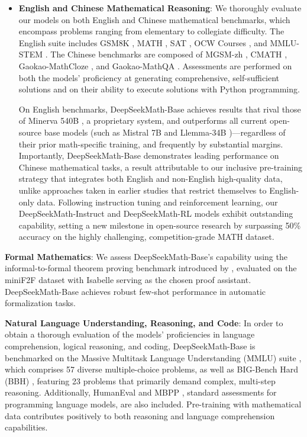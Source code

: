 \begin{itemize}[topsep=0pt]
    \item \textbf{English and Chinese Mathematical Reasoning}: We thoroughly evaluate our models on both English and Chinese mathematical benchmarks, which encompass problems ranging from elementary to collegiate difficulty. The English suite includes GSM8K \citep{gsm8k}, MATH \citep{MATH}, SAT \citep{llemma}, OCW Courses \citep{minerva}, and MMLU-STEM \citep{mmlu}. The Chinese benchmarks are composed of MGSM-zh \citep{mgsm}, CMATH \citep{wei2023cmath}, Gaokao-MathCloze \citep{agieval}, and Gaokao-MathQA \citep{agieval}. Assessments are performed on both the models' proficiency at generating comprehensive, self-sufficient solutions and on their ability to execute solutions with Python programming.

    On English benchmarks, DeepSeekMath-Base achieves results that rival those of Minerva 540B \citep{minerva}, a proprietary system, and outperforms all current open-source base models (such as Mistral 7B \citep{mistral} and Llemma-34B \citep{llemma})—regardless of their prior math-specific training, and frequently by substantial margins. Importantly, DeepSeekMath-Base demonstrates leading performance on Chinese mathematical tasks, a result attributable to our inclusive pre-training strategy that integrates both English and non-English high-quality data, unlike approaches taken in earlier studies \citep{minerva,llemma} that restrict themselves to English-only data. Following instruction tuning and reinforcement learning, our DeepSeekMath-Instruct and DeepSeekMath-RL models exhibit outstanding capability, setting a new milestone in open-source research by surpassing 50\% accuracy on the highly challenging, competition-grade MATH dataset.
\end{itemize}

\item \textbf{Formal Mathematics}: We assess DeepSeekMath-Base's capability using the informal-to-formal theorem proving benchmark introduced by \citep{dsp_proof}, evaluated on the miniF2F dataset \citep{minif2f} with Isabelle \citep{isabelle} serving as the chosen proof assistant. DeepSeekMath-Base achieves robust few-shot performance in automatic formalization tasks.

\item \textbf{Natural Language Understanding, Reasoning, and Code}: In order to obtain a thorough evaluation of the models' proficiencies in language comprehension, logical reasoning, and coding, DeepSeekMath-Base is benchmarked on the Massive Multitask Language Understanding (MMLU) suite \citep{mmlu}, which comprises 57 diverse multiple-choice problems, as well as BIG-Bench Hard (BBH) \citep{bbh}, featuring 23 problems that primarily demand complex, multi-step reasoning. Additionally, HumanEval \citep{codex} and MBPP \citep{mbpp}, standard assessments for programming language models, are also included. Pre-training with mathematical data contributes positively to both reasoning and language comprehension capabilities.

